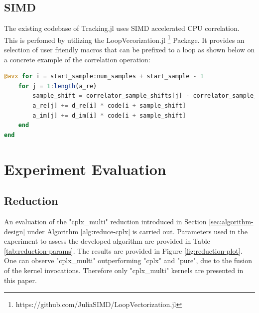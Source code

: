 \documentclass{juliacon}
\begin{document}
\subsection*{SIMD}
The existing codebase of Tracking.jl uses SIMD accelerated CPU correlation. This is perfomed by utilizing the LoopVecorization.jl \footnote{https://github.com/JuliaSIMD/LoopVectorization.jl} Package. It provides an selection of user friendly macros that can be prefixed to a loop as shown below on a concrete example of the correlation operation:
\begin{lstlisting}[language = Julia]
@avx for i = start_sample:num_samples + start_sample - 1
    for j = 1:length(a_re)
        sample_shift = correlator_sample_shifts[j] - correlator_sample_shifts[1]
        a_re[j] += d_re[i] * code[i + sample_shift]
        a_im[j] += d_im[i] * code[i + sample_shift]
    end
end
\end{lstlisting}
\section{Experiment Evaluation}\label{sec:analysis}

\subsection*{Reduction}
An evaluation of the "cplx\_multi" reduction introduced in Section \ref{sec:algorithm-design} under Algorithm \ref{alg:reduce-cplx} is carried out. Parameters used in the experiment to assess the developed algorithm are provided in Table \ref{tab:reduction-params}. The results are provided in Figure \ref{fig:reduction-plot}. One can observe "cplx\_multi" outperforming "cplx" and "pure", due to the fusion of the kernel invocations. Therefore only "cplx\_multi" kernels are presented in this paper.
\end{document}
